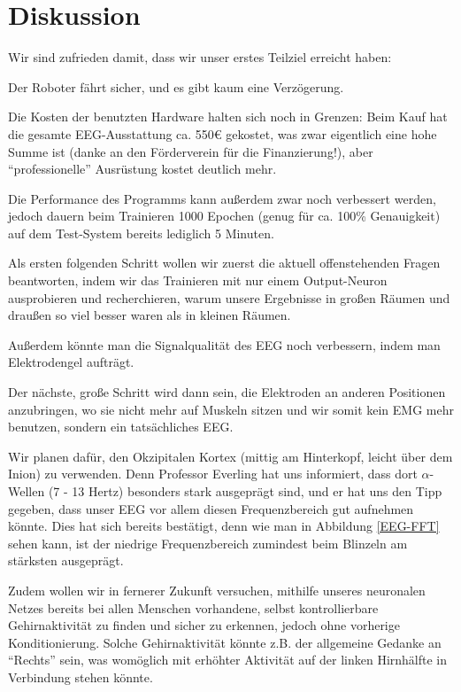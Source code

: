 \documentclass{scrartcl}
\begin{document}
	\section{Diskussion}

	Wir sind zufrieden damit, dass wir unser erstes Teilziel erreicht haben:

	Der Roboter fährt sicher, und es gibt kaum eine Verzögerung.

	Die Kosten der benutzten Hardware halten sich noch in Grenzen: Beim Kauf hat die gesamte EEG-Ausstattung ca. 550€ gekostet, was zwar eigentlich eine hohe Summe ist (danke an den Förderverein für die Finanzierung!), aber \enquote{professionelle} Ausrüstung kostet deutlich mehr.

	Die Performance des Programms kann außerdem zwar noch verbessert werden, jedoch dauern beim Trainieren 1000 Epochen (genug für ca. 100\% Genauigkeit) auf dem Test-System bereits lediglich 5 Minuten. 

	Als ersten folgenden Schritt wollen wir zuerst die aktuell offenstehenden Fragen beantworten, indem wir das Trainieren mit nur einem Output-Neuron ausprobieren und recherchieren, warum unsere Ergebnisse in großen Räumen und draußen so viel besser waren als in kleinen Räumen.

	Außerdem könnte man die Signalqualität des EEG noch verbessern, indem man Elektrodengel aufträgt. 

	Der nächste, große Schritt wird dann sein, die Elektroden an anderen Positionen anzubringen, wo sie nicht mehr auf Muskeln sitzen und wir somit kein EMG mehr benutzen, sondern ein tatsächliches EEG.

	Wir planen dafür, den Okzipitalen Kortex (mittig am Hinterkopf, leicht über dem Inion) zu verwenden. Denn Professor Everling hat uns informiert, dass dort $\alpha$-Wellen (7 - 13 Hertz) besonders stark ausgeprägt sind, und er hat uns den Tipp gegeben, dass unser EEG vor allem diesen Frequenzbereich gut aufnehmen könnte. Dies hat sich bereits bestätigt, denn wie man in Abbildung \ref{EEG-FFT} sehen kann, ist der niedrige Frequenzbereich zumindest beim Blinzeln am stärksten ausgeprägt.

	Zudem wollen wir in fernerer Zukunft versuchen, mithilfe unseres neuronalen Netzes bereits bei allen Menschen vorhandene, selbst kontrollierbare Gehirnaktivität zu finden und sicher zu erkennen, jedoch ohne vorherige Konditionierung. Solche Gehirnaktivität könnte z.B. der allgemeine Gedanke an \enquote{Rechts} sein, was womöglich mit erhöhter Aktivität auf der linken Hirnhälfte in Verbindung stehen könnte.
	
\end{document}
